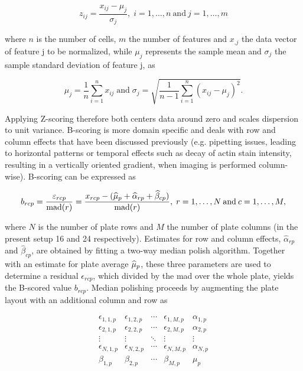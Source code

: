 \begin{equation}
  z_{ij} = \frac{x_{ij} - \mu_j}{\sigma_j}, \; i=1, \dotsc, n \: \text{and} \: j=1, \dotsc, m
\end{equation}

where $n$ is the number of cells, $m$ the number of features and $x_{.j}$ the data vector of feature j to be normalized, while $\mu_j$ represents the sample mean and $\sigma_j$ the sample standard deviation of feature j, as

\begin{equation}
  \mu_j = \frac{1}{n} \sum_{i=1}^n x_{ij} \; \text{and} \; \sigma_j = \sqrt{\frac{1}{n-1} \sum_{i=1}^n (x_{ij}-\mu_j)^2}.
\end{equation}

Applying Z-scoring therefore both centers data around zero and scales dispersion to unit variance. B-scoring is more domain specific and deals with row and column effects that have been discussed previously (e.g. pipetting issues, leading to horizontal patterns or temporal effects such as decay of actin stain intensity, resulting in a vertically oriented gradient, when imaging is performed column-wise). B-scoring can be expressed as

\begin{equation}
  b_{rcp} = \frac{\varepsilon_{rcp}}{\operatorname{mad}(r)} = \frac{x_{rcp} - (\widehat{\mu}_p + \widehat{\alpha}_{rp} + \widehat{\beta}_{cp})}{\operatorname{mad}(r)}, \; r=1, \dotsc, N \: \text{and} \: c=1, \dotsc, M,
\end{equation}

where $N$ is the number of plate rows and $M$ the number of plate columns (in the present setup 16 and 24 respectively). Estimates for row and column effects, $\widehat{\alpha}_{rp}$ and $\widehat{\beta}_{cp}$, are obtained by fitting a two-way median polish algorithm. Together with an estimate for plate average $\widehat{\mu}_p$, these three parameters are used to determine a residual $\epsilon_{rcp}$, which divided by the \gls{mad} over the whole plate, yields the B-scored value $b_{rcp}$. Median polishing proceeds by augmenting the plate layout with an additional column and row as

\begin{equation*}
  \begin{array}{cccc|c}
    \epsilon_{1,1,p} & \epsilon_{1,2,p} & \cdots & \epsilon_{1,M,p} & \alpha_{1,p} \\
    \epsilon_{2,1,p} & \epsilon_{2,2,p} & \cdots & \epsilon_{2,M,p} & \alpha_{2,p} \\
    \vdots  & \vdots  & \ddots & \vdots & \vdots \\
    \epsilon_{N,1,p} & \epsilon_{N,2,p} & \cdots & \epsilon_{N,M,p} & \alpha_{N,p} \\
    \hline
    \beta_{1,p} & \beta_{2,p} & \cdots & \beta_{M,p} & \mu_{p} \\
  \end{array}
\end{equation*}

